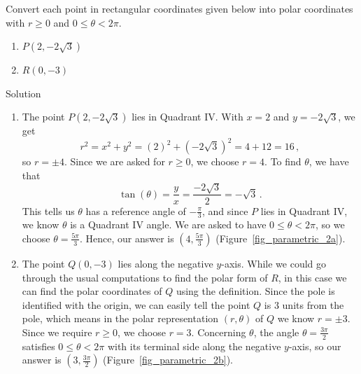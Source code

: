 \begin{example}  \label{pointconversionex}  
 Convert each point in rectangular coordinates given below into polar coordinates with $r \geq 0$ and $0 \leq \theta < 2\pi$. 

\begin{multicols}{2}

\begin{enumerate}

\item  $P\left(2,-2\sqrt{3}\right)$


\item  $R(0,-3)$


\end{enumerate}

\end{multicols}

Solution 


\begin{enumerate}

\item  The point $P\left(2,-2\sqrt{3}\right)$ lies in Quadrant IV.  With $x = 2$ and $y = -2\sqrt{3}$, we get 
$$r^2 = x^2 + y^2 = (2)^2 + \left(-2\sqrt{3}\right)^2 = 4+12 = 16\,,$$ 
so $r = \pm 4$.  Since we are asked for $r \geq 0$, we choose $r = 4$.  To find $\theta$, we have that 
$$\tan(\theta) = \frac{y}{x} = \frac{-2\sqrt{3}}{2} = -\sqrt{3}\,.$$
This tells us $\theta$ has a reference angle of $-\frac{\pi}{3}$, and  since $P$ lies in Quadrant IV, we know $\theta$ is a Quadrant IV angle.   We are asked to have $0 \leq \theta < 2\pi$, so we choose $\theta = \frac{5\pi}{3}$.  Hence, our answer is  $\left(4, \frac{5\pi}{3}\right)$ (Figure~\ref{fig_parametric_2a}). 

\item The point $Q(0,-3)$ lies along the negative $y$-axis.  While we could go through the usual computations to find the polar form of $R$, in this case we can find the polar coordinates of $Q$ using the definition. Since the pole is identified with the origin, we can easily tell the point $Q$ is $3$ units from the pole, which means in the polar representation $(r, \theta)$ of $Q$ we know $r = \pm 3$.  Since we require $r \geq 0$, we choose $r = 3$.  Concerning $\theta$, the angle $\theta = \frac{3\pi}{2}$ satisfies $0 \leq \theta < 2\pi$ with its terminal side along the negative $y$-axis, so our answer is $\left(3, \frac{3\pi}{2}\right)$ (Figure~\ref{fig_parametric_2b}).  

\end{enumerate}


\end{example}

